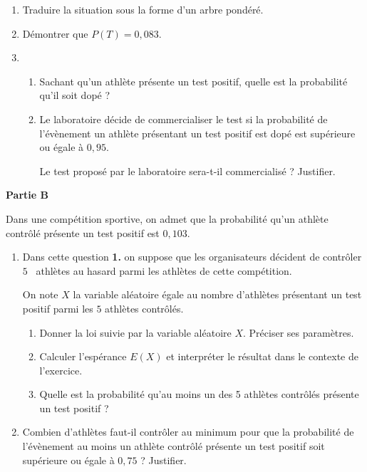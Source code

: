 \documentclass[11pt]{article}
\begin{document}
\medskip

\begin{enumerate}
\item Traduire la situation sous la forme d'un arbre pondéré.
\item Démontrer que $P(T) = 0,083$.
\item 
	\begin{enumerate}
		\item Sachant qu'un athlète présente un test positif, quelle est la probabilité qu'il soit dopé ?
		\item Le laboratoire décide de commercialiser le test si la probabilité de l'évènement \og un athlète présentant un test positif est dopé \fg{} est supérieure ou égale à $0,95$.

Le test proposé par le laboratoire sera-t-il commercialisé ? Justifier.
	\end{enumerate}
\end{enumerate}

\bigskip

\textbf{Partie B}

\medskip

Dans une compétition sportive, on admet que la probabilité qu'un athlète contrôlé présente un test positif est $0,103$.

\medskip

\begin{enumerate}
\item Dans cette question \textbf{1.} on suppose que les organisateurs décident de contrôler $5$ ~athlètes au hasard parmi les athlètes de cette compétition. 

On note $X$ la variable aléatoire égale au nombre d'athlètes présentant un test positif parmi les $5$ athlètes contrôlés.
	\begin{enumerate}
		\item Donner la loi suivie par la variable aléatoire $X$. Préciser ses paramètres.
		\item Calculer l'espérance $E(X)$ et interpréter le résultat dans le contexte de l'exercice.
		\item Quelle est la probabilité qu'au moins un des 5 athlètes contrôlés présente un test positif ?
	\end{enumerate}
\item Combien d'athlètes faut-il contrôler au minimum pour que la probabilité de l'évènement \og au moins un athlète contrôlé présente un test positif\fg{} soit supérieure ou égale à $0,75$ ? Justifier.
\end{enumerate}
\vspace{0,5cm}
\bigskip
\end{document}
